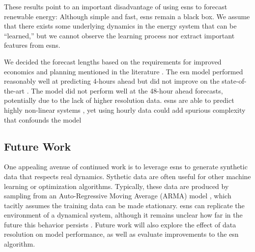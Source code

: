 These results point to an important disadvantage of using \glspl{esn} to
forecast renewable energy: Although simple and fast, \glspl{esn} remain a black
box. We assume that there exists some underlying dynamics in the energy system
that can be ``learned,'' but we cannot observe the learning process nor extract
important features from \glspl{esn}.

We decided the forecast lengths based on the requirements for improved
economics and planning mentioned in the literature
 \cite{wang_quantifying_2016,mc_garrigle_quantifying_2015,brancucci_martinez-anido_value_2016}. The \gls{esn} model performed reasonably well at predicting
 4-hours ahead but did not improve on the state-of-the-art
 \cite{wang_quantifying_2016,powers_weather_2017}. The model did not perform
 well at the 48-hour ahead forecasts, potentially due to the lack of higher
 resolution data. \glspl{esn} are able to predict highly non-linear
  systems \cite{jaeger_harnessing_2004,lukosevicius_reservoir_2009}, yet
 using hourly data could add spurious complexity that confounds the model
 \cite{garland_model-free_2014}

\subsection{Future Work}
One appealing avenue of continued work is to leverage \glspl{esn} to generate
synthetic data that respects real dynamics. Sythetic data are often useful for
other machine learning or optimization algorithms. Typically, these data are
produced by sampling from an Auto-Regressive Moving Average (ARMA) model \cite{baker_optimal_2018, garcia_dynamic_2016}, which tacitly assumes the
training data can be made stationary. \glspl{esn} can replicate
the environment of a dynamical system, although it remains unclear how far
in the future this behavior persists \cite{pathak_using_2017,pathak_model-free_2018}.
Future work will also explore the effect of data resolution on model
performance, as well as evaluate improvements to the \gls{esn}
algorithm.
